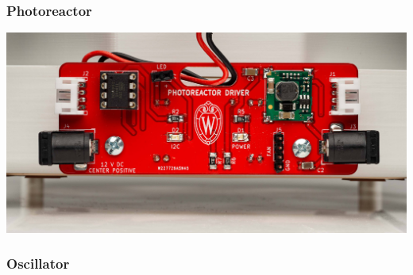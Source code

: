 \documentclass{presentation}
\begin{document}
\begin{frame}\frametitle{Photoreactor}
  \includegraphics[width=\textwidth]{"./Philip (27).jpg"}
\end{frame}

\begin{frame}\frametitle{Oscillator}
\end{frame}
\end{document}
